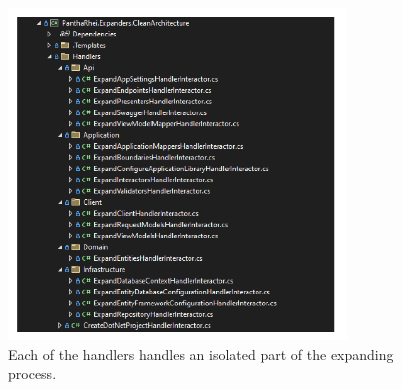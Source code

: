 \begin{figure}[H]
    \centering
    \includegraphics[width=0.8\textwidth]{Figures/expander_handlers.pdf}
    \caption[handlers]{Each of the handlers handles an isolated part of the expanding process.}
    \label{fig:handlers}
\end{figure}
